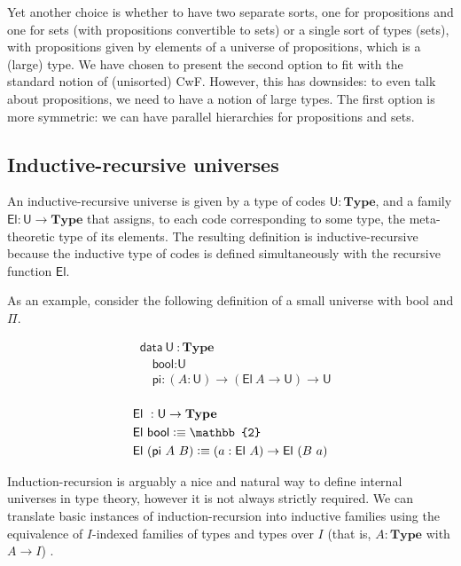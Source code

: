 \documentclass[autoref]{llncs}
\newcommand{\mType}{\mathbf{Type}}
\newcommand{\U}{\textsf{U}}
\newcommand{\El}{\textsf{El}}
\providecommand\mathbbm{\mathbb}
\newcommand{\defeq}{\mathrel{\vcentcolon\equiv}}
\begin{document}
Yet another choice is whether to have two separate sorts, one for propositions
and one for sets (with propositions convertible to sets) or a single sort of
types (sets), with propositions given by elements of a universe of propositions,
which is a (large) type. We have chosen to present the second option to fit with
the standard notion of (unisorted) CwF. However, this has downsides: to even
talk about propositions, we need to have a notion of large types. The first
option is more symmetric: we can have parallel hierarchies for propositions and
sets.

\subsection{Inductive-recursive universes}\label{ir-universes}

An inductive-recursive universe is given by a type of codes $\U : \mType$, and a
family $\El : \U \to \mType$ that assigns, to each code corresponding to some
type, the meta-theoretic type of its elements. The resulting definition is
inductive-recursive because the inductive type of codes is defined
simultaneously with the recursive function $\El$.

As an example, consider the following definition of a small universe with
bool and $\Pi$. \\
\vspace{-0.2em}
\begin{minipage}{0.45\textwidth}
\begin{align*}
  & \textsf{data}\ \U\ : \mType \\
  & \quad \textsf{bool} : \U \\
  & \quad \textsf{pi} : (A : \U) \to (\El\ A \to \U) \to \U \\
\end{align*}
\end{minipage}
\begin{minipage}{0.45\textwidth}
\begin{align*}
  & \El\ : \U \to \mType \\
  & \El\ \textsf{bool} \defeq \mathbbm{2} \\
  & \El\ (\textsf{pi}\ A\ B) \defeq (a : \El\ A) \to \El\ (B\ a) \\
\end{align*}
\end{minipage}

Induction-recursion is arguably a nice and natural way to define internal
universes in type theory, however it is not always strictly required.
%
We can translate basic instances of induction-recursion into inductive families
using the equivalence of $I$-indexed families of types and types over $I$
(that is, $A : \mType$ with $A \to I$) \cite{malatasta13smallir}.
\end{document}
